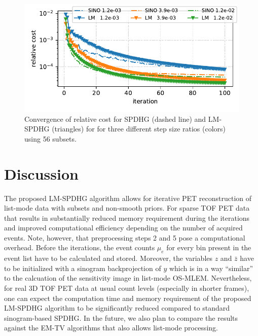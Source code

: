 \documentclass{IEEEtran}
\begin{document}
\begin{figure}[t]
\centerline{\includegraphics[width=0.8\columnwidth]{./figs/brain2d_counts_1.0E+06_beta_2.0E-03_niter_10000_100_nsub_56_precond_False_metrics.pdf}}
\caption{Convergence of relative cost for SPDHG (dashed line) and LM-SPDHG (triangles) 
for for three different step size ratios (colors) using 56 subsets.}
\label{fig:cost}
\end{figure}


\section{Discussion}

The proposed LM-SPDHG algorithm allows for  iterative PET reconstruction of list-mode
data with subsets and non-smooth priors.
For sparse TOF PET data that results in substantially reduced memory requirement during
the iterations and improved computational efficiency depending on the number of acquired
events.
Note, however, that preprocessing steps 2 and 5 pose a computational overhead. 
Before the iterations, the event counts $\mu_e$ for every bin present in the event list
have to be calculated and stored.
Moreover, the variables $z$ and $\bar{z}$ have to be initialized with a sinogram
backprojection of $y$ which is in a way ``similar'' to the calcuation of the sensitivity
image in list-mode OS-MLEM.
Nevertheless, for real 3D TOF PET data at usual count levels (especially in shorter frames), one can
expect the computation time and memory requirement of the proposed LM-SPDHG algorithm to be significantly reduced compared to standard sinogram-based SPDHG.
In the future, we also plan to compare the results against the EM-TV algorithms that also
allows list-mode processing.

\end{document}
